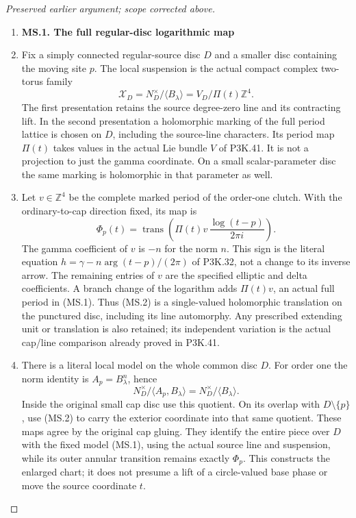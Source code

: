 \begin{proof}[Preserved earlier argument; scope corrected above]
\begin{enumerate}[label=\arabic*.]
\item \par

\medskip\noindent\textbf{MS.1. The full regular-disc logarithmic map}

\par\nobreak

\item Fix a simply connected regular-source disc \(D\) and a smaller disc
containing the moving site \(p\). The local suspension is the actual
compact complex two-torus family
\[
 \mathcal X_D=N_D^\times/\langle B_\lambda\rangle
       =V_D/\Pi(t)\mathbb Z^4.                         \tag{MS.1}
\]
The first presentation retains the source degree-zero line and its
contracting lift. In the second presentation a holomorphic marking of
the full period lattice is chosen on \(D\), including the source-line
characters. Its period map \(\Pi(t)\) takes values in the actual Lie
bundle \(V\) of P3K.41. It is not a projection to just the gamma
coordinate. On a small scalar-parameter disc the same marking is
holomorphic in that parameter as well.

\item Let \(v\in\mathbb Z^4\) be the complete marked period of the
order-one clutch. With the ordinary-to-cap direction fixed, its map is
\[
 \Phi_p(t)=\operatorname{trans}\left(
       \Pi(t)v\,\frac{\log(t-p)}{2\pi i}\right).        \tag{MS.2}
\]
The gamma coefficient of \(v\) is \(-n\) for the norm \(n\).
This sign is the literal equation
\(h=\gamma-n\arg(t-p)/(2\pi)\) of P3K.32, not a change to its
inverse arrow. The remaining entries of \(v\) are the specified
elliptic and delta coefficients. A branch change of the logarithm adds
\(\Pi(t)v\), an actual full period in (MS.1). Thus (MS.2) is a
single-valued holomorphic translation on the punctured disc, including
its line automorphy. Any prescribed extending unit or translation is
also retained; its independent variation is the actual cap/line
comparison already proved in P3K.41.

\item There is a literal local model on the whole common disc \(D\).
For order one the norm identity is \(A_p=B_\lambda^n\), hence
\[
 N_D^\times/\langle A_p,B_\lambda\rangle
              =N_D^\times/\langle B_\lambda\rangle .    \tag{MS.3}
\]
Inside the original small cap disc use this quotient. On its overlap
with \(D\setminus\{p\}\), use (MS.2) to carry the exterior
coordinate into that same quotient. These maps agree by the original
cap gluing. They identify the entire piece over \(D\) with the
fixed model (MS.1), using the actual source line and suspension, while
its outer annular transition remains exactly \(\Phi_p\). This
constructs the enlarged chart; it does not presume a lift of a
circle-valued base phase or move the source coordinate \(t\).


\end{enumerate}
\end{proof}
